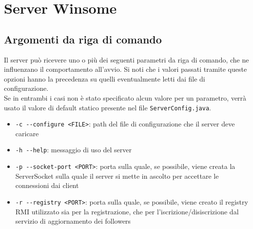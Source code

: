 \section{Server Winsome}
\subsection{Argomenti da riga di comando}
Il server può ricevere uno o più dei seguenti parametri da riga di comando, che ne influenzano il comportamento all'avvio. Si noti che i valori passati tramite queste opzioni hanno la precedenza su quelli eventualmente letti dai file di configurazione.\\
Se in entrambi i casi non è stato specificato alcun valore per un parametro, verrà usato il valore di default statico presente nel file \verb|ServerConfig.java|.

\begin{itemize}
	\item \verb|-c --configure <FILE>|: path del file di configurazione che il server deve caricare
	\item \verb|-h --help|: messaggio di uso del server
	\item \verb|-p --socket-port <PORT>|: porta sulla quale, se possibile, viene creata la ServerSocket sulla quale il server si mette in ascolto per accettare le
	connessioni dai client
	\item \verb|-r --registry <PORT>|: porta sulla quale, se possibile, viene creato il registry RMI utilizzato sia per la registrazione, che per l'iscrizione/disiscrizione dal servizio di aggiornamento dei followers
\end{itemize}

